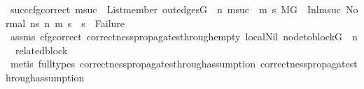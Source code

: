 \begin{isabellebody}
\ succ{\isacharunderscore}{\kern0pt}cfg{\isacharunderscore}{\kern0pt}correct{\isacharcolon}{\kern0pt}\ {\isachardoublequoteopen}{\isacharparenleft}{\kern0pt}{\isasymforall}msuc{}{\isachardot}{\kern0pt}\ \ List{\isachardot}{\kern0pt}member\ {\isacharparenleft}{\kern0pt}out{\isacharunderscore}{\kern0pt}edges{\isacharparenleft}{\kern0pt}G{\isacharparenright}{\kern0pt}\ {\isacharbang}{\kern0pt}\ n{\isacharparenright}{\kern0pt}\ msuc{}\ {\isasymlongrightarrow}\ {\isacharparenleft}{\kern0pt}{\isasymforall}m{}\ s{}{\isachardot}{\kern0pt}\ {\isacharparenleft}{\kern0pt}{\isacharparenleft}{\kern0pt}M{\isacharcomma}{\kern0pt}{\isasymLambda}{\isacharcomma}{\kern0pt}{\isasymGamma}{\isacharcomma}{\kern0pt}{\isasymOmega}{\isacharcomma}{\kern0pt}G\ {\isasymturnstile}\ {\isacharparenleft}{\kern0pt}Inl{\isacharparenleft}{\kern0pt}msuc{}{\isacharparenright}{\kern0pt}{\isacharcomma}{\kern0pt}\ Normal\ ns{}{\isacharparenright}{\kern0pt}\ {\isacharminus}{\kern0pt}n{\isasymrightarrow}{\isacharasterisk}{\kern0pt}\ {\isacharparenleft}{\kern0pt}m{}{\isacharcomma}{\kern0pt}\ s{}{\isacharparenright}{\kern0pt}{\isacharparenright}{\kern0pt}\ {\isasymlongrightarrow}\ s{}\ {\isasymnoteq}\ Failure{\isacharparenright}{\kern0pt}{\isacharparenright}{\kern0pt}{\isacharparenright}{\kern0pt}{\isachardoublequoteclose}\isanewline
\ \ \ \ \ \ \ \ \ \ \ \ \ \ \isamarkupfalse%
\ assms{\isacharparenleft}{\kern0pt}{}{\isacharparenright}{\kern0pt}\ cfg{\isacharunderscore}{\kern0pt}correct\ correctness{\isacharunderscore}{\kern0pt}propagates{\isacharunderscore}{\kern0pt}through{\isacharunderscore}{\kern0pt}empty\ local{\isachardot}{\kern0pt}Nil\ {\isacartoucheopen}node{\isacharunderscore}{\kern0pt}to{\isacharunderscore}{\kern0pt}block{\isacharparenleft}{\kern0pt}G{\isacharparenright}{\kern0pt}\ {\isacharbang}{\kern0pt}\ n\ {\isacharequal}{\kern0pt}\ related{\isacharunderscore}{\kern0pt}block{\isacartoucheclose}\isanewline
\ \ \ \ \ \ \ \ \ \ \ \ \ \ \isamarkupfalse%
\ {\isacharparenleft}{\kern0pt}metis\ {\isacharparenleft}{\kern0pt}full{\isacharunderscore}{\kern0pt}types{\isacharparenright}{\kern0pt}\ correctness{\isacharunderscore}{\kern0pt}propagates{\isacharunderscore}{\kern0pt}through{\isacharunderscore}{\kern0pt}assumption\ correctness{\isacharunderscore}{\kern0pt}propagates{\isacharunderscore}{\kern0pt}through{\isacharunderscore}{\kern0pt}assumption{}{\isacharparenright}{\kern0pt}\ \isanewline
\isanewline
\ \ \ \ \ \ \ \ \ \ \ \ \isamarkupfalse%

\end{isabellebody}
